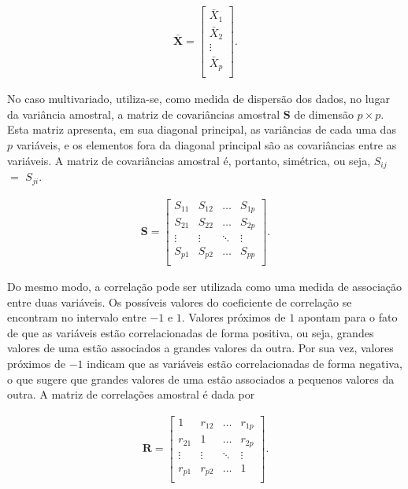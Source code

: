 \documentclass[
	12pt,				%
	openright,			%
	oneside,			%
	a4paper,			%
	chapter=TITLE,		%
	section=TITLE,		%
	english,			%
	french,				%
	spanish,			%
	brazil				%
	]{abntex2}
\begin{document}
\begin{align*}
	\boldsymbol{\bar{X}} = \left[
	\begin{array}{c}
		\bar{X}_1\\
		\bar{X}_2\\
		\vdots\\
		\bar{X}_p\\
	\end{array}
	\right].
\end{align*}

No caso multivariado,  utiliza-se, como medida de dispersão dos dados, no lugar da variância amostral, a matriz de covariâncias amostral $\boldsymbol{S}$ de dimensão $p \times p$. Esta matriz apresenta, em sua diagonal principal, as variâncias de cada uma das $p$ variáveis, e os elementos fora da diagonal principal são as covariâncias entre as variáveis. A matriz de covariâncias amostral é, portanto, simétrica, ou seja,  $S_{ij}$ $=$ $S_{ji}$.


\begin{align*}
	\boldsymbol{S} =
	\left[
	\begin{array}{cccc}
		S_{11} & S_{12} & \dots & S_{1p} \\
		S_{21} & S_{22} & \dots & S_{2p} \\
		\vdots & \vdots & \ddots & \vdots \\
		S_{p1} & S_{p2} & \dots & S_{pp} \\
	\end{array}
	\right].
\end{align*}        

Do mesmo modo, a correlação pode ser utilizada como uma medida de associação entre duas variáveis. Os possíveis valores do coeficiente de correlação se encontram no intervalo entre $-1$ e $1$. Valores próximos de $1$ apontam para o fato de  que as variáveis estão correlacionadas de forma positiva, ou seja, grandes valores de uma estão associados a grandes valores da outra. Por sua vez, valores próximos de $-1$ indicam que as variáveis estão correlacionadas de forma negativa, o que sugere que grandes valores de uma estão associados a pequenos valores da outra. A matriz de correlações amostral é dada por 

\begin{align*}
	\boldsymbol{R} =
	\left[
	\begin{array}{cccc}
		1      & r_{12} & \dots  & r_{1p} \\
		r_{21} & 1 & \dots  & r_{2p} \\
		\vdots & \vdots & \ddots & \vdots \\
		r_{p1} & r_{p2} & \dots  & 1\\
	\end{array}
	\right].
\end{align*}        
\end{document}

